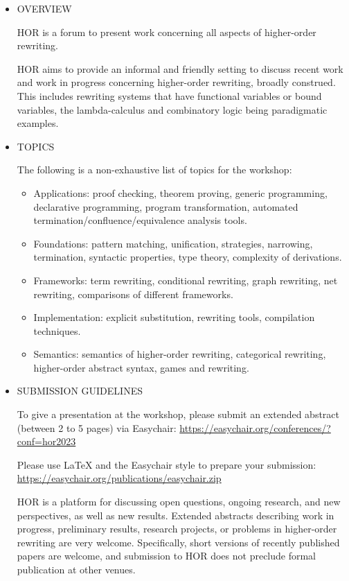 \documentclass[prodmode,acmtecs]{acmsmall} %
\begin{document}
\begin{itemize}\item  OVERVIEW 
 
  HOR is a forum to present work concerning all aspects of higher-order rewriting. 
 
  HOR aims to provide an informal and friendly setting to discuss recent work and work in progress concerning higher-order rewriting, broadly construed. This includes rewriting systems that have functional variables or bound variables, the lambda-calculus and combinatory logic being paradigmatic examples. 
 
\item  TOPICS 
 
  The following is a non-exhaustive list of topics for the workshop: 
 
\begin{itemize}\item  Applications: proof checking, theorem proving, generic programming, declarative programming, program transformation, automated termination/confluence/equivalence analysis tools.
\item  Foundations: pattern matching, unification, strategies, narrowing, termination, syntactic properties, type theory, complexity of derivations.
\item  Frameworks: term rewriting, conditional rewriting, graph rewriting, net rewriting, comparisons of different frameworks.
\item  Implementation: explicit substitution, rewriting tools, compilation techniques.
\item  Semantics: semantics of higher-order rewriting, categorical rewriting, higher-order abstract syntax, games and rewriting.
\end{itemize} 
\item  SUBMISSION GUIDELINES  
 
  To give a presentation at the workshop, please submit an extended abstract (between 2 to 5 pages) via Easychair: \href{https://easychair.org/conferences/?conf=hor2023}{https://easychair.org/conferences/?conf=hor2023}  
 
  Please use LaTeX and the Easychair style to prepare your submission: \href{https://easychair.org/publications/easychair.zip}{https://easychair.org/publications/easychair.zip} 
 
  HOR is a platform for discussing open questions, ongoing research, and new perspectives, as well as new results. Extended abstracts describing work in progress, preliminary results, research projects, or problems in higher-order rewriting are very welcome. Specifically, short versions of recently published papers are welcome, and submission to HOR does not preclude formal publication at other venues. 
 

\end{itemize}
\end{document}
